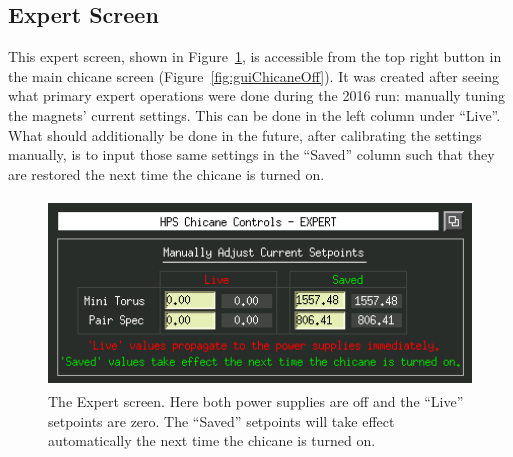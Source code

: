 \documentclass[amsmath,amssymb,notitlepage,11pt]{revtex4-1}
\begin{document}
\subsection{Expert Screen}
This expert screen, shown in Figure~\ref{fig:expert}, is accessible from the top right button in the main chicane screen (Figure~\ref{fig:guiChicaneOff}).  It was created after seeing what primary expert operations were done during the 2016 run:  manually tuning the magnets' current settings.  This can be done in the left column under ``Live''.  What should additionally be done in the future, after calibrating the settings manually, is to input those same settings in the ``Saved'' column such that they are restored the next time the chicane is turned on. 
\begin{figure}[htbp]\centering
    \includegraphics[height=5cm]{pics/expertA}
    \caption{The Expert screen.  Here both power supplies are off and the ``Live'' setpoints are zero.  The ``Saved'' setpoints will take effect automatically the next time the chicane is turned on.\label{fig:expert}}
\end{figure}
\end{document}
